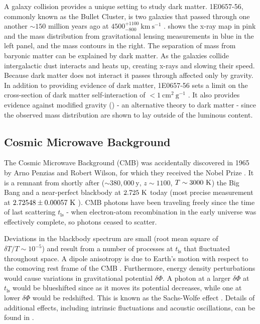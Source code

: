 A galaxy collision provides a unique setting to study dark matter.  1E0657-56, commonly known as the Bullet Cluster, is two galaxies that
passed through one another ${\sim}150$ million years ago at $4500_{-800}^{+1100}\ \mathrm{km\ s^{-1}}$
.   shows the x-ray map in pink and the mass
distribution from gravitational lensing measurements in blue in the left panel, and the mass contours in the right.  The separation of
mass from baryonic matter can be explained by dark matter.  As the galaxies collide intergalactic dust interacts
and heats up, creating x-rays and slowing their speed.  Because dark matter does not interact it passes
through affected only by gravity.  In addition to providing evidence of dark matter, 1E0657-56 sets a limit on the
cross-section of dark matter self-interaction of $<1\ \mathrm{cm^{2}\ g^{-1}}$ .  It also provides evidence
against modified gravity () - an alternative theory to dark matter - since the observed mass distribution
are shown to lay outside of the luminous content.




\subsection{Cosmic Microwave Background} \label{subsec:cmb}
The Cosmic Microwave Background (CMB) was accidentally discovered in 1965 by Arno Penzias and Robert Wilson, for which they received
the Nobel Prize .  It
is a remnant from shortly after (${\sim}380,000\ \mathrm{y}$, $z\sim1100$, $T\sim3000\ \mathrm{K}$) the Big Bang  and a near-perfect
blackbody at $2.725\ \mr{K}$ today (most precise measurement at $2.72548 \pm 0.00057\ \mathrm{K}$ ).  CMB photons
have been traveling freely since the time of last scattering $t_{\mathrm{ls}}$ - when electron-atom recombination in the early universe
was effectively complete, so photons ceased to scatter.

Deviations in the blackbody spectrum are small (root mean square of $\delta T/T \sim 10^{-5}$) and result from a number of
processes at $t_{\mathrm{ls}}$ that fluctuated throughout space.  A dipole anisotropy is due to
Earth's motion with respect to the comoving rest frame of the CMB .  Furthermore,
energy density perturbations would cause variations in gravitational potential $\delta \Phi$.  A
photon at a larger $\delta \Phi$ at $t_{\mathrm{ls}}$ would be blueshifted since as it moves its
potential decreases, while one at lower $\delta \Phi$ would be redshifted.  This is known as the
Sachs-Wolfe effect .  Details of additional effects, including intrinsic fluctuations and acoustic
oscillations, can be found in .

